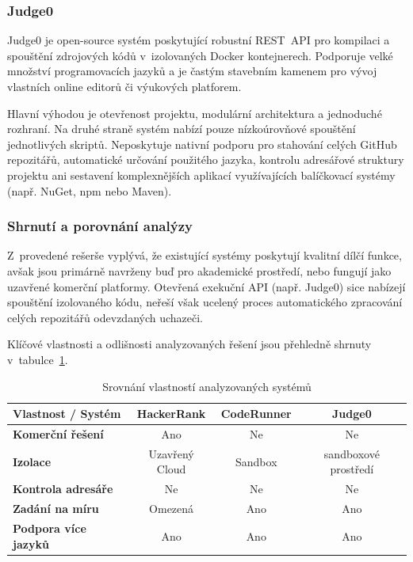\documentclass[
  biblatex,
  figures,
  tables,
  glossaries,
  index
]{kidiplom}
\begin{document}
\subsubsection{Judge0}
Judge0 je open-source systém poskytující robustní REST~API pro kompilaci a spouštění zdrojových kódů v~izolovaných Docker kontejnerech. Podporuje velké množství programovacích jazyků a je častým stavebním kamenem pro vývoj vlastních online editorů či výukových platforem.~\cite{judge0}

Hlavní výhodou je otevřenost projektu, modulární architektura a jednoduché rozhraní. Na druhé straně systém nabízí pouze nízkoúrovňové spouštění jednotlivých skriptů. Neposkytuje nativní podporu pro stahování celých GitHub repozitářů, automatické určování použitého jazyka, kontrolu adresářové struktury projektu ani sestavení komplexnějších aplikací využívajících balíčkovací systémy (např. NuGet, npm nebo Maven).


\subsubsection{Shrnutí a porovnání analýzy}
Z~provedené rešerše vyplývá, že existující systémy poskytují kvalitní dílčí funkce, avšak jsou primárně navrženy buď pro akademické prostředí, nebo fungují jako uzavřené komerční platformy. Otevřená exekuční API (např. Judge0) sice nabízejí spouštění izolovaného kódu, neřeší však ucelený proces automatického zpracování celých repozitářů odevzdaných uchazeči.

Klíčové vlastnosti a odlišnosti analyzovaných řešení jsou přehledně shrnuty v~tabulce~\ref{tab:srovnanisys}.

\begin{table}[H]
	\centering
	\small
	\begin{tabular}{|l|c|c|c|}
		\hline
		\textbf{Vlastnost / Systém} & \textbf{HackerRank} & \textbf{CodeRunner} & \textbf{Judge0} \\ \hline
		\textbf{Komerční řešení} & Ano & Ne & Ne  \\ \hline
		\textbf{Izolace} & Uzavřený Cloud & Sandbox & sandboxové prostředí \\ \hline
		\textbf{Kontrola adresáře} & Ne & Ne & Ne \\ \hline
		\textbf{Zadání na míru} & Omezená & Ano & Ano  \\ \hline
		\textbf{Podpora více jazyků} & Ano & Ano & Ano \\ \hline
	\end{tabular}
	\caption{Srovnání vlastností analyzovaných systémů}
	\label{tab:srovnanisys}
\end{table}
\end{document}

